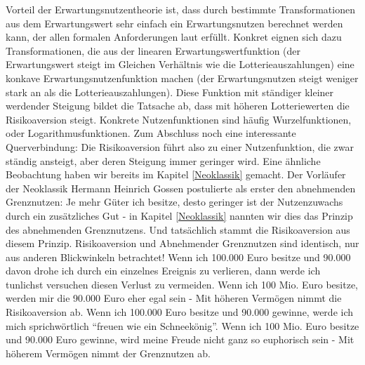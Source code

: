 Vorteil der Erwartungsnutzentheorie ist, dass durch bestimmte Transformationen aus dem Erwartungswert sehr einfach ein Erwartungsnutzen berechnet werden kann, der allen formalen Anforderungen laut \textcite{Morgenstern1944} erfüllt. Konkret eignen sich dazu Transformationen, die aus der linearen Erwartungswertfunktion (der Erwartungswert steigt im Gleichen Verhältnis wie die Lotterieauszahlungen) eine konkave Erwartungsnutzenfunktion machen (der Erwartungsnutzen steigt weniger stark an als die Lotterieauszahlungen). Diese Funktion mit ständiger kleiner werdender Steigung bildet die Tatsache ab, dass mit höheren Lotteriewerten die Risikoaversion steigt. Konkrete Nutzenfunktionen sind häufig Wurzelfunktionen, oder Logarithmusfunktionen. Zum Abschluss noch eine interessante Querverbindung: Die Risikoaversion führt also zu einer Nutzenfunktion, die zwar ständig ansteigt, aber deren Steigung immer geringer wird. Eine ähnliche Beobachtung haben wir bereits im Kapitel \ref{Neoklassik} gemacht. Der Vorläufer der Neoklassik Hermann Heinrich Gossen postulierte als erster den abnehmenden Grenznutzen: Je mehr Güter ich besitze, desto geringer ist der Nutzenzuwachs durch ein zusätzliches Gut - in Kapitel \ref{Neoklassik} nannten wir dies das Prinzip des abnehmenden Grenznutzens. Und tatsächlich stammt die Risikoaversion aus diesem Prinzip. Risikoaversion und Abnehmender Grenznutzen sind identisch, nur aus anderen Blickwinkeln betrachtet! Wenn ich 100.000 Euro besitze und 90.000 davon drohe ich durch ein einzelnes Ereignis zu verlieren, dann werde ich tunlichst versuchen diesen Verlust zu vermeiden. Wenn ich 100 Mio. Euro besitze, werden mir die 90.000 Euro eher egal sein - Mit höheren Vermögen nimmt die Risikoaversion ab. Wenn ich 100.000 Euro besitze und 90.000 gewinne, werde ich mich sprichwörtlich "`freuen wie ein Schneekönig"'. Wenn ich 100 Mio. Euro besitze und 90.000 Euro gewinne, wird meine Freude nicht ganz so euphorisch sein - Mit höherem Vermögen nimmt der Grenznutzen ab.

